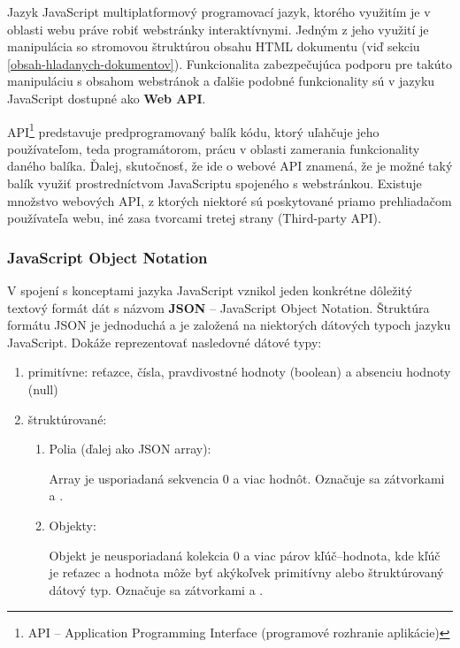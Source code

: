 Jazyk JavaScript multiplatformový programovací jazyk, ktorého využitím je v oblasti webu práve robiť webstránky interaktívnymi. 
Jedným z jeho využití je manipulácia so stromovou štruktúrou obsahu HTML dokumentu (viď sekciu \ref{obsah-hladanych-dokumentov}).
Funkcionalita zabezpečujúca podporu pre takúto manipuláciu s obsahom webstránok a ďalšie podobné funkcionality sú v jazyku JavaScript dostupné ako \textbf{Web API}.

API\footnote{API -- Application Programming Interface (programové rozhranie aplikácie)} predstavuje predprogramovaný balík kódu, ktorý uľahčuje jeho používateľom, teda programátorom, prácu v oblasti zamerania funkcionality daného balíka.
Ďalej, skutočnosť, že ide o webové API znamená, že je možné taký balík využiť prostredníctvom JavaScriptu spojeného s webstránkou.
Existuje množstvo webových API, z ktorých niektoré sú poskytované priamo prehliadačom používateľa webu, iné zasa tvorcami tretej strany (Third-party API).


\subsubsection{JavaScript Object Notation}
\label{json}

V spojení s konceptami jazyka JavaScript vznikol jeden konkrétne dôležitý textový formát dát s názvom \textbf{JSON} -- JavaScript Object Notation.
Štruktúra formátu JSON je jednoduchá a je založená na niektorých dátových typoch jazyku JavaScript.
Dokáže reprezentovať nasledovné dátové typy:
\begin{enumerate}
    \item primitívne: reťazce, čísla, pravdivostné hodnoty (boolean) a absenciu hodnoty (null)
    
    \item štruktúrované: 
    \begin{enumerate}
        \item Polia (ďalej ako JSON array):

        Array je usporiadaná sekvencia 0 a viac hodnôt. Označuje sa zátvorkami \code{[} a \code{]}. 

        \pagebreak

        \item Objekty:

        Objekt je neusporiadaná kolekcia 0 a viac párov kľúč--hodnota, kde kľúč je reťazec
        a hodnota môže byť akýkoľvek primitívny alebo štruktúrovaný dátový typ.
        Označuje sa zátvorkami \code{\{} a \code{\}}.
    \end{enumerate}
\end{enumerate}

